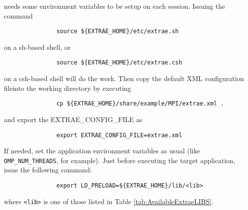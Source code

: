 \TRACE needs some environment variables to be setup on each session. Issuing the command 

\begin{verbatim}
               source ${EXTRAE_HOME}/etc/extrae.sh
\end{verbatim}

on a sh-based shell, or 

\begin{verbatim}
               source ${EXTRAE_HOME}/etc/extrae.csh
\end{verbatim}

on a csh-based shell will do the work. Then copy the default XML configuration file\footnotemark[1] into the working directory by executing

\begin{verbatim}
               cp ${EXTRAE_HOME}/share/example/MPI/extrae.xml .
\end{verbatim}

and export the {EXTRAE\_CONFIG\_FILE} as

\begin{verbatim}
               export EXTRAE_CONFIG_FILE=extrae.xml
\end{verbatim}

If needed, set the application environment variables as usual (like {\tt OMP\_NUM\_THREADS}, for example). Just before executing the target application, issue the following command:

\begin{verbatim}
               export LD_PRELOAD=${EXTRAE_HOME}/lib/<lib>
\end{verbatim}

where {\tt <lib>} is one of those listed in Table \ref{tab:AvailableExtraeLIBS}. 

